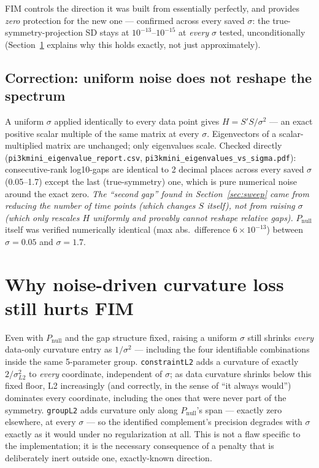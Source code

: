 \documentclass[11pt]{article}
\newcommand{\code}[1]{\texttt{#1}}
\newcommand{\file}[1]{\textcolor{black!60}{\texttt{#1}}}
\begin{document}
FIM controls the direction it was built from essentially perfectly, and
provides \emph{zero} protection for the new one --- confirmed across every
saved $\sigma$: the true-symmetry-projection SD stays at
$10^{-13}$--$10^{-15}$ at \emph{every} $\sigma$ tested, unconditionally
(Section~\ref{sec:noise-scaling} explains why this holds exactly, not just
approximately).

\subsection{Correction: uniform noise does not reshape the spectrum}

A uniform $\sigma$ applied identically to every data point gives $H = S'S/
\sigma^2$ --- an exact positive scalar multiple of the same matrix at every
$\sigma$. Eigenvectors of a scalar-multiplied matrix are unchanged; only
eigenvalues scale. Checked directly (\file{pi3kmini\_eigenvalue\_report.csv},
\file{pi3kmini\_eigenvalues\_vs\_sigma.pdf}): consecutive-rank log10-gaps are
identical to 2 decimal places across every saved $\sigma$ (0.05--1.7) except
the last (true-symmetry) one, which is pure numerical noise around the exact
zero. \emph{The ``second gap'' found in Section~\ref{sec:sweep} came from
reducing the number of time points (which changes $S$ itself), not from
raising $\sigma$ (which only rescales $H$ uniformly and provably cannot
reshape relative gaps).} $P_{\text{null}}$ itself was verified numerically
identical (max abs.\ difference $6\times 10^{-13}$) between $\sigma=0.05$ and
$\sigma=1.7$.

\section{Why noise-driven curvature loss still hurts FIM}
\label{sec:noise-scaling}

Even with $P_{\text{null}}$ and the gap structure fixed, raising a uniform
$\sigma$ still shrinks \emph{every} data-only curvature entry as $1/\sigma^2$
--- including the four identifiable combinations inside the same 5-parameter
group. \code{constraintL2} adds a curvature of exactly $2/\sigma_{L2}^2$ to
\emph{every} coordinate, independent of $\sigma$; as data curvature shrinks
below this fixed floor, L2 increasingly (and correctly, in the sense of
``it always would'') dominates every coordinate, including the ones that
were never part of the symmetry. \code{groupL2} adds curvature only along
$P_{\text{null}}$'s span --- exactly zero elsewhere, at every $\sigma$ ---
so the identified complement's precision degrades with $\sigma$ exactly as
it would under no regularization at all. This is not a flaw specific to the
implementation; it is the necessary consequence of a penalty that is
deliberately inert outside one, exactly-known direction.
\end{document}
